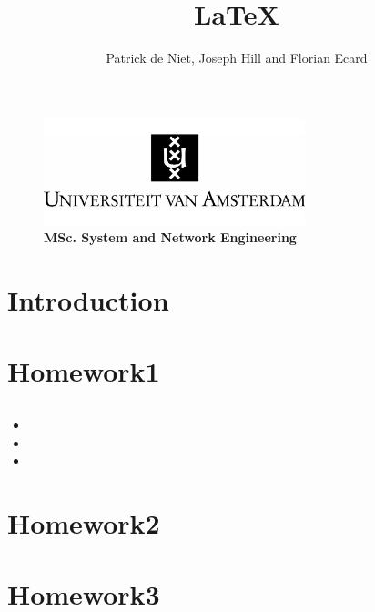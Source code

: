 \documentclass[10pt,a4paper]{article}
\author{Patrick de Niet, Joseph Hill and Florian Ecard}
\title{\LaTeX}
\begin{document}
    
\begin{figure}[t]
\centering
\includegraphics[width=7.6cm]{uva.jpg}\\
\textbf{{MSc. System and Network Engineering}}
\end{figure}
\maketitle


\newpage
\section{Introduction}
\paragraph{}


\newpage
\tableofcontents


\newpage
\section{Homework1}

\subsection{}
\paragraph{}
\begin{itemize}
\item 
\item %
\item
\end{itemize}




\newpage
\section{Homework2}
\paragraph{}



\newpage
\section{Homework3}
\paragraph{}





\newpage
\listoffigures

\newpage
{}

\end{document}
